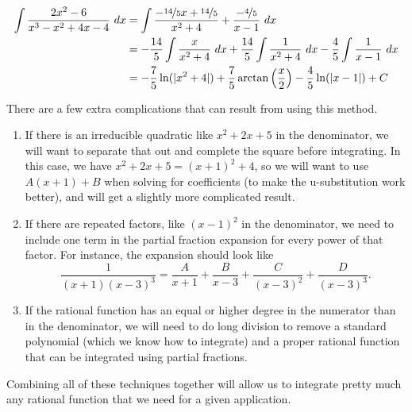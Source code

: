 \begin{exampleSol}
\begin{equation*}
\begin{split}
\int \frac{2x^2 - 6}{x^3 - x^2 + 4x - 4}\ dx &= \int  \frac{-\nicefrac{14}{5}x + \nicefrac{14}{5}}{x^2 + 4} + \frac{-\nicefrac{4}{5}}{x-1}\ dx \\
&= -\frac{14}{5} \int \frac{x}{x^2 + 4}\ dx + \frac{14}{5} \int \frac{1}{x^2 + 4}\ dx - \frac{4}{5} \int \frac{1}{x-1}\ dx \\
&= -\frac{7}{5}\ln(|x^2 + 4|) + \frac{7}{5} \arctan\left(\frac{x}{2}\right) - \frac{4}{5}\ln(|x-1|) + C
\end{split}
\end{equation*}
\end{exampleSol}

There are a few extra complications that can result from using this method.
\begin{enumerate}
\item If there is an irreducible quadratic like $x^2 + 2x + 5$ in the denominator, we will want to separate that out and complete the square before integrating. In this case, we have $x^2 + 2x + 5 = (x+1)^2 + 4$, so we will want to use $A(x+1) + B$ when solving for coefficients (to make the u-substitution work better), and will get a slightly more complicated result.
\item If there are repeated factors, like $(x-1)^2$ in the denominator, we need to include one term in the partial fraction expansion for every power of that factor. For instance, the expansion should look like
\begin{equation*}
\frac{1}{(x+1)(x-3)^3} = \frac{A}{x+1} + \frac{B}{x-3} + \frac{C}{(x-3)^2} + \frac{D}{(x-3)^3}.
\end{equation*}
\item If the rational function has an equal or higher degree in the numerator than in the denominator, we will need to do long division to remove a standard polynomial (which we know how to integrate) and a proper rational function that can be integrated using partial fractions.
\end{enumerate}

Combining all of these techniques together will allow us to integrate pretty much any rational function that we need for a given application. 
